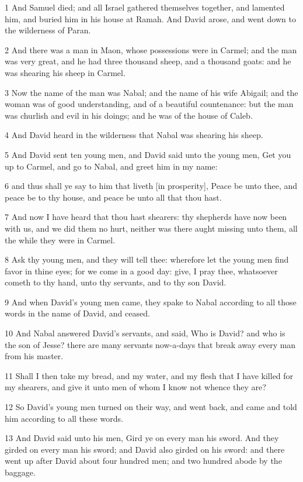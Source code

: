 \par 1 And Samuel died; and all Israel gathered themselves together, and lamented him, and buried him in his house at Ramah. And David arose, and went down to the wilderness of Paran.
\par 2 And there was a man in Maon, whose possessions were in Carmel; and the man was very great, and he had three thousand sheep, and a thousand goats: and he was shearing his sheep in Carmel.
\par 3 Now the name of the man was Nabal; and the name of his wife Abigail; and the woman was of good understanding, and of a beautiful countenance: but the man was churlish and evil in his doings; and he was of the house of Caleb.
\par 4 And David heard in the wilderness that Nabal was shearing his sheep.
\par 5 And David sent ten young men, and David said unto the young men, Get you up to Carmel, and go to Nabal, and greet him in my name:
\par 6 and thus shall ye say to him that liveth [in prosperity], Peace be unto thee, and peace be to thy house, and peace be unto all that thou hast.
\par 7 And now I have heard that thou hast shearers: thy shepherds have now been with us, and we did them no hurt, neither was there aught missing unto them, all the while they were in Carmel.
\par 8 Ask thy young men, and they will tell thee: wherefore let the young men find favor in thine eyes; for we come in a good day: give, I pray thee, whatsoever cometh to thy hand, unto thy servants, and to thy son David.
\par 9 And when David's young men came, they spake to Nabal according to all those words in the name of David, and ceased.
\par 10 And Nabal answered David's servants, and said, Who is David? and who is the son of Jesse? there are many servants now-a-days that break away every man from his master.
\par 11 Shall I then take my bread, and my water, and my flesh that I have killed for my shearers, and give it unto men of whom I know not whence they are?
\par 12 So David's young men turned on their way, and went back, and came and told him according to all these words.
\par 13 And David said unto his men, Gird ye on every man his sword. And they girded on every man his sword; and David also girded on his sword: and there went up after David about four hundred men; and two hundred abode by the baggage.
